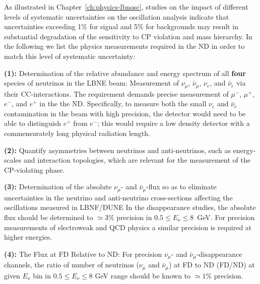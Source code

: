 As illustrated in Chapter~\ref{ch:physics-lbnosc}, studies on the impact of different levels of systematic 
uncertainties on the oscillation analysis indicate 
that uncertainties exceeding 1\% for signal and 5\% for backgrounds may result in 
substantial degradation of the sensitivity to CP violation and mass hierarchy. 
In the following we list the physics measurements required in the ND in order to 
match this level of systematic uncertainty:   

\vspace{0.25cm} 
\noindent
{\bf (1):}  Determination of the relative abundance and 
energy spectrum of all  {\bf four} species of neutrinos in the LBNE beam: Measurement of 
$\nu_\mu$, $\bar \nu_\mu$, $\nu_e$, and $\bar \nu_e$ via their  CC-interactions.  
The requirement demands precise measurement of $\mu^-$, $\mu^+$, $e^-$, and $e^+$ in the 
the ND. Specifically, to measure both the small $\nu_e$ and $\bar \nu_e$ contamination in the beam with high precision, 
the detector would need to be able to distinguish $e^+$  from $e^-$; 
this would require a low density detector with a commensurately long physical radiation length. 


\vspace{0.25cm} 
\noindent
{\bf (2):} Quantify asymmetries between neutrinos and anti-neutrinos, such as 
energy-scales and interaction topologies, which are relevant for the measurement of the CP-violating phase. 


\vspace{0.25cm} 
\noindent
{\bf (3):} Determination of the absolute $\nu_\mu$- and $\bar \nu_\mu$-flux so as to  eliminate uncertainties in the neutrino and anti-neutrino cross-sections 
affecting the oscillations measured  in LBNF/DUNE In the  disappearance 
studies, the absolute flux should be determined to $\simeq 3\%$ precision in 
$0.5 \leq E_\nu \leq 8$~GeV. For precision measurements of electroweak 
and QCD physics a similar precision is required at higher energies. 

\vspace{0.25cm} 
\noindent
{\bf (4):} The  Flux at FD Relative to ND: For precision $\nu_\mu$- and $\bar \nu_\mu$-disappearance  
channels, the ratio of number of neutrinos ($\nu_\mu$  and $\bar \nu_\mu$) at FD to ND (FD/ND) 
at given $E_\nu$ bin in $0.5 \leq E_\nu \leq 8$ GeV range should be known 
to $\simeq 1\%$ precision. 

